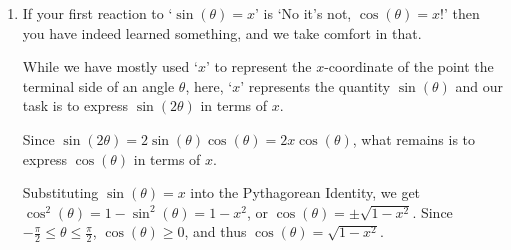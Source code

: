 \documentclass{ximera}
\begin{document}
\begin{example}
\begin{enumerate}
\begin{image}
\end{image}








\item  If your first reaction to `$\sin(\theta) = x$' is `No it's not, $\cos(\theta) = x$!' then you have indeed learned something, and we take comfort in that. 

 

While we have mostly used `$x$' to represent the $x$-coordinate of the point the terminal side of an angle $\theta$, here, `$x$' represents the quantity $\sin(\theta)$  and our task is to express $\sin(2\theta)$ in terms of $x$.  

 

Since $\sin(2\theta) = 2 \sin(\theta) \cos(\theta) = 2 x \cos(\theta)$, what remains is to express  $\cos(\theta)$ in terms of $x$.    

 

Substituting  $\sin(\theta) = x$ into the Pythagorean Identity, we get $\cos^{2}(\theta)  = 1-  \sin^{2}(\theta) = 1 - x^2$, or  $\cos(\theta) = \pm \sqrt{1-x^2}$.  Since  $-\frac{\pi}{2} \leq \theta \leq \frac{\pi}{2}$, $\cos(\theta) \geq 0$, and thus $\cos(\theta) = \sqrt{1-x^2}$.  


\end{enumerate}
\end{example}
\end{document}
